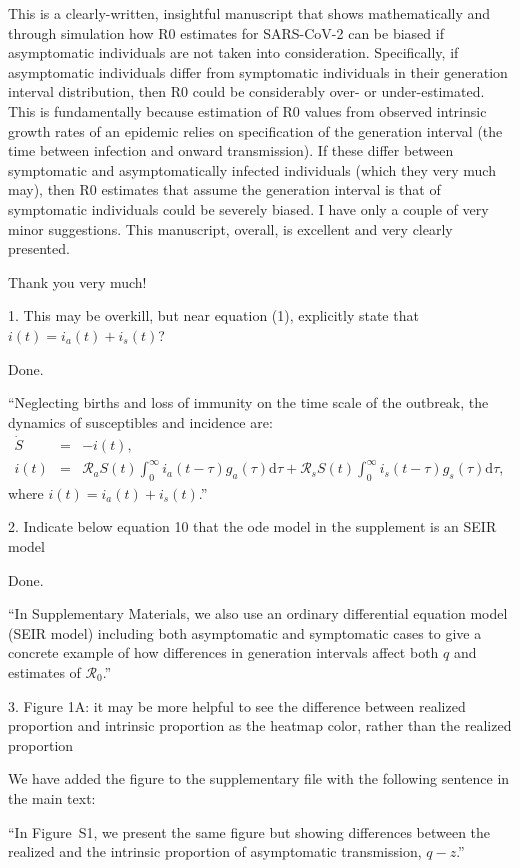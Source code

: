 \documentclass[12pt]{article}
\newcommand{\revtext}{\textsf}
\begin{document}
\revtext{This is a clearly-written, insightful manuscript that shows mathematically and through simulation how R0 estimates for SARS-CoV-2 can be biased if asymptomatic individuals are not taken into consideration. Specifically, if asymptomatic individuals differ from symptomatic individuals in their generation interval distribution, then R0 could be considerably over- or under-estimated. This is fundamentally because estimation of R0 values from observed intrinsic growth rates of an epidemic relies on specification of the generation interval (the time between infection and onward transmission). If these differ between symptomatic and asymptomatically infected individuals (which they very much may), then R0 estimates that assume the generation interval is that of symptomatic individuals could be severely biased.
I have only a couple of very minor suggestions. This manuscript, overall, is excellent and very clearly presented.}

Thank you very much!

\revtext{1. This may be overkill, but near equation (1), explicitly state that $i(t) = i_a(t) + i_s(t)$?}

Done.

``Neglecting births and loss of immunity on the time scale of the outbreak, the dynamics of susceptibles and incidence are:
\begin{eqnarray}
\dot{S}&=&-i(t), \\
i(t)&=&\mathcal R_a S(t) \int_0^\infty i_a(t-\tau) g_a(\tau) \mathrm{d}\tau + \mathcal R_s S(t) \int_0^\infty i_s(t-\tau) g_s(\tau) \mathrm{d}\tau,
\end{eqnarray}
where $i(t) = i_a(t) + i_s(t)$.''

\revtext{2. Indicate below equation 10 that the ode model in the supplement is an SEIR model}

Done.

``In Supplementary Materials, we also use an ordinary differential equation model (SEIR model) including both asymptomatic and symptomatic cases to give a concrete example of how differences in generation intervals affect both $q$ and estimates of $\mathcal R_0$.''

\revtext{3. Figure 1A: it may be more helpful to see the difference between realized proportion and intrinsic proportion as the heatmap color, rather than the realized proportion}

We have added the figure to the supplementary file with the following sentence in the main text:

``In Figure~S1, we present the same figure but showing differences between the realized and the intrinsic proportion of asymptomatic transmission, $q-z$.''
\end{document}
